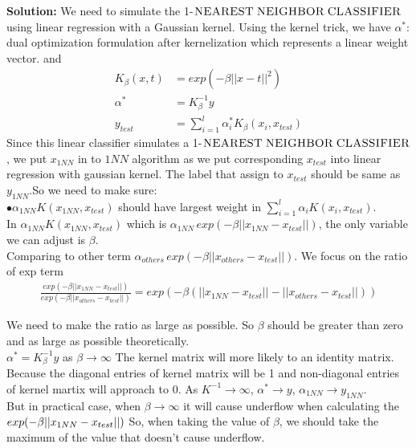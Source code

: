 \documentclass[A4,12pt]{article}
\begin{document}
\begin{enumerate}[6.]
\begin{enumerate}[8.]
\textbf{Solution:} We need to simulate the 1-$\textsc{NEAREST}\; \textsc{NEIGHBOR}\; \textsc{CLASSIFIER}$ using linear regression with a Gaussian kernel. Using the kernel trick, we have $\alpha^{*}$: dual optimization formulation after kernelization which represents a linear weight vector.   and
\begin{equation}
\begin{aligned}
    K_\beta(x,t)&=exp\left(-\beta||x-t||^2\right)\\
     \alpha^{*}&=K_{\beta}^{-1} y\\
    y_{test} &= \sum_{i=1}^l \alpha^{*}_i K_{\beta}(x_i,x_{test})
\end{aligned}
\end{equation}
Since this linear classifier simulates a 1-$\textsc{NEAREST}\; \textsc{NEIGHBOR}\; \textsc{CLASSIFIER}$, we put $x_{1NN}$ in to $1NN$ algorithm as we put corresponding $x_{test}$ into linear regression with gaussian kernel. The label that assign to $x_{test}$ should be same as $y_{1NN}$.So we need to make sure:\\
$\bullet \alpha_{1NN} K(x_{1NN},x_{test})$ should have largest weight in $\sum_{i=1}^l \alpha_i K(x_i,x_{test})$.\\

In $\alpha_{1NN}K(x_{1NN},x_{test})$ which is $\alpha_{1NN}\, exp(-\beta||x_{1NN}-x_{test}||)$, the only variable we can adjust is $\beta$. \\Comparing to other term $\alpha_{others}\,exp(-\beta||x_{others}-x_{test}||)$. We focus on the ratio of exp term
\begin{equation}
\begin{aligned}
    \frac{exp(-\beta||x_{1NN}-x_{test}||)}{exp(-\beta||x_{others}-x_{test}||)}=exp\left(-\beta(||x_{1NN}-x_{test}||-||x_{others}-x_{test}||)\right)
\end{aligned}
\end{equation}

 We need to make the ratio as large as possible. So $\beta$ should be greater than zero and as large as possible theoretically.\\
$\alpha^{*}=K_{\beta}^{-1}y$ as $\beta \rightarrow \infty$ The kernel matrix will more likely to an identity matrix. Because the diagonal entries of kernel matrix will be 1 and non-diagonal entries of kernel martix will approach to 0. As $K^{-1}\rightarrow \infty$, $\alpha^{*}\rightarrow y$, $\alpha_{1NN}\rightarrow y_{1NN}$.\\
 But in practical case, when $\beta \rightarrow \infty$ it will cause underflow when calculating the $exp(-\beta\\||x_{1NN}-x_{test}||)$ So, when taking the value of $\beta$, we should take the maximum of the value that doesn't cause underflow. 



\end{enumerate}
\end{enumerate}
\end{document}
